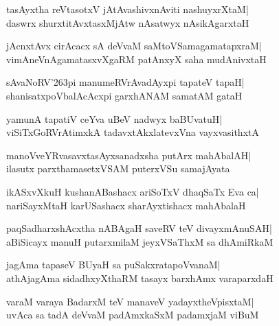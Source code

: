 \documentclass[twoside,12pt,openright]{book}
\def\S{\char'263}
\newcounter{shloka}[chapter]
\begin{document}
\begin{shloka}%
tasAyxtha reVtasotxV jAtAvashivxnAviti nashuyxrXtaM|\\
daswrx shurxtitAvxtasxMjAtw nAsatwyx nAsikAgarxtaH
\end{shloka}

\begin{shloka}%
jAcnxtAvx cirAcacx sA deVvaM saMtoVSamagamatapxraM|\\
vimAneVnAgamatasxvXgaRM patAnxyX saha mudAnivxtaH
\end{shloka}

\begin{shloka}%
sAvaNoRV\S pi manumeRVrAvadAyxpi tapateV tapaH|\\
shanisatxpoVbalAcAcxpi garxhANAM samatAM gataH
\end{shloka}

\begin{shloka}%
yamunA tapatiV ceYva uBeV nadwyx baBUvatuH|\\
viSiTxGoRVrAtimxkA tadavxtAkxlatevxVna vayxvasithxtA
\end{shloka}

\begin{shloka}%
manoVveYRvasavxtasAyxsanadxsha putArx mahAbalAH|\\
ilasutx parxthamasetxVSAM puterxVSu samajAyata
\end{shloka}

\begin{shloka}%
ikASxvXkuH kushanABashacx ariSoTxV dhaqSaTx Eva ca|\\
nariSayxMtaH karUSashacx sharAyxtishacx mahAbalaH
\end{shloka}

\begin{shloka}%
paqSadharxshAcxtha nABAgaH saveRV teV divayxmAnuSAH|\\
aBiSicayx manuH putarxmilaM jeyxVSaThxM sa dhAmiRkaM
\end{shloka}

\begin{shloka}%
jagAma tapaseV BUyaH sa puSakxratapoVvanaM|\\
athAjagAma sidadhxyXthaRM tasayx barxhAmx varaparxdaH
\end{shloka}

\begin{shloka}%
varaM varaya BadarxM teV manaveV yadayxtheVpisxtaM|\\
uvAca sa tadA deVvaM padAmxkaSxM padamxjaM viBuM
\end{shloka}
\end{document}
